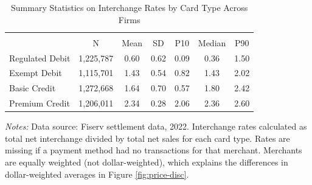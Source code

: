 \documentclass[11pt,english]{article}
\theoremstyle{remark}
\begin{document}
\clearpage

\begin{table}[H]
\caption{Summary Statistics on Interchange Rates by Card Type Across Firms
\label{tab:icg-summary}}

\centering

{
\def\sym#1{\ifmmode^{#1}\else\(^{#1}\)\fi}
\begin{tabular}{l*{1}{cccccc}}
\hline\hline
                    &\multicolumn{6}{c}{}                                                         \\
                    &           N&        Mean&          SD&         P10&      Median&         P90\\
\hline
Regulated Debit     &   1,225,787&        0.60&        0.62&        0.09&        0.36&        1.50\\
Exempt Debit        &   1,115,701&        1.43&        0.54&        0.82&        1.43&        2.02\\
Basic Credit        &   1,272,668&        1.64&        0.70&        0.57&        1.80&        2.42\\
Premium Credit      &   1,206,011&        2.34&        0.28&        2.06&        2.36&        2.60\\
\hline\hline
\end{tabular}
}
 
\par\textit{Notes:} Data source: Fiserv settlement data, 2022. Interchange rates calculated as total net interchange divided by total net sales for each card type. Rates are missing if a payment method had no transactions for that merchant. Merchants are equally weighted (not dollar-weighted), which explains the differences in dollar-weighted averages in Figure \ref{fig:price-disc}.
\end{table}

\clearpage
\end{document}
